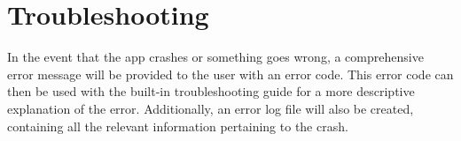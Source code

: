\documentclass[hidelinks,a4paper,12pt]{article}
\begin{document}
\section{Troubleshooting}
	In the event that the app crashes or something goes wrong, a comprehensive error message will be provided to the user with an error code. This error code can then be used with the built-in troubleshooting guide for a more descriptive explanation of the error. Additionally, an error log file will also be created, containing all the relevant information pertaining to the crash.
		
\end{document}
